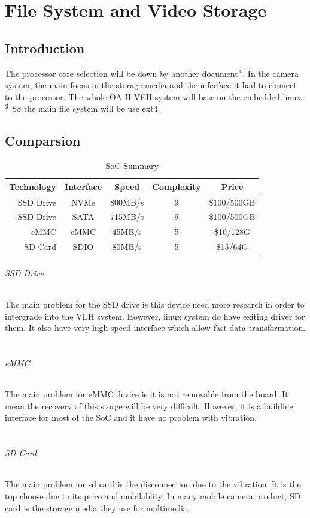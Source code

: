 \documentclass[12pt,article]{memoir}
\begin{document}
\chapter{File System and Video Storage}
\section{Introduction}
The processor core selection will be down by another document$\footnote{ES00005 - OA-II Payload Modules Architecture}$. In the camera system, the main focus in the storage media and the inferface it had to connect to the processor. The whole OA-II VEH system will base on the embedded linux.$\footnote{DR00003 - OA-II VEH COM System Design}$ So the main file system will be use ext4.
\section{Comparsion}
\begin{table}[H]
	\centering
		\begin{tabu}{r || c | c | c | c }
		Technology & Interface & Speed & Complexity & Price\\ \hline
		SSD Drive & NVMe & 800MB/s & 9 &  \$100/500GB\\
		SSD Drive & SATA & 715MB/s & 9 & \$100/500GB \\
		eMMC & eMMC & 45MB/s & 5 & \$10/128G \\
		SD Card & SDIO & 80MB/s & 5 & \$15/64G \\
		\end{tabu}
	\caption{SoC Summary}
	\label{tab:socs}
\end{table}
\subparagraph{SSD Drive}
The main problem for the SSD drive is this device need more research in order to intergrade into the VEH system. However, linux system do have exiting driver for them. It also have very high speed interface which allow fast data transformation.\\\\
\subparagraph{eMMC}
The main problem for eMMC device is it is not removable from the board. It mean the recovery of this storge will be very difficult. However, it is a building interface for most of the SoC and it have no problem with vibration.\\\\
\subparagraph{SD Card}
The main problem for sd card is the disconnection due to the vibration. It is the top choose due to its price and mobilablity. In many mobile camera product, SD card is the storage media they use for multimedia.
\newpage
\end{document}
